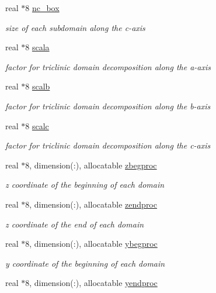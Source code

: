 \begin{DoxyCompactItemize}
real $\ast$8 \hyperlink{classdomdec_a9fd61bdb5b4eba47980730d881363787}{nc\-\_\-box}
\begin{DoxyCompactList}\small\item\em size of each subdomain along the c-\/axis \end{DoxyCompactList}\item 
real $\ast$8 \hyperlink{classdomdec_a1faa8e227097e532c46ee84194d04b47}{scala}
\begin{DoxyCompactList}\small\item\em factor for triclinic domain decomposition along the a-\/axis \end{DoxyCompactList}\item 
real $\ast$8 \hyperlink{classdomdec_a23f02d2e4ca2feba1b70a3d4d5c15f2b}{scalb}
\begin{DoxyCompactList}\small\item\em factor for triclinic domain decomposition along the b-\/axis \end{DoxyCompactList}\item 
real $\ast$8 \hyperlink{classdomdec_a5176236515e982fadc86d9efe2b8782f}{scalc}
\begin{DoxyCompactList}\small\item\em factor for triclinic domain decomposition along the c-\/axis \end{DoxyCompactList}\item 
real $\ast$8, dimension(\-:), allocatable \hyperlink{classdomdec_aa8643c5e6b0645ac75284c7efe4f34d1}{zbegproc}
\begin{DoxyCompactList}\small\item\em z coordinate of the beginning of each domain \end{DoxyCompactList}\item 
real $\ast$8, dimension(\-:), allocatable \hyperlink{classdomdec_abe04500dc8986693d1cf4aea49441a39}{zendproc}
\begin{DoxyCompactList}\small\item\em z coordinate of the end of each domain \end{DoxyCompactList}\item 
real $\ast$8, dimension(\-:), allocatable \hyperlink{classdomdec_a263ad8d8a74766cf8e38f798d814b1d2}{ybegproc}
\begin{DoxyCompactList}\small\item\em y coordinate of the beginning of each domain \end{DoxyCompactList}\item 
real $\ast$8, dimension(\-:), allocatable \hyperlink{classdomdec_ae0cd9f6b6f40a123f8332cccae7d4cc1}{yendproc}

\end{DoxyCompactItemize}
